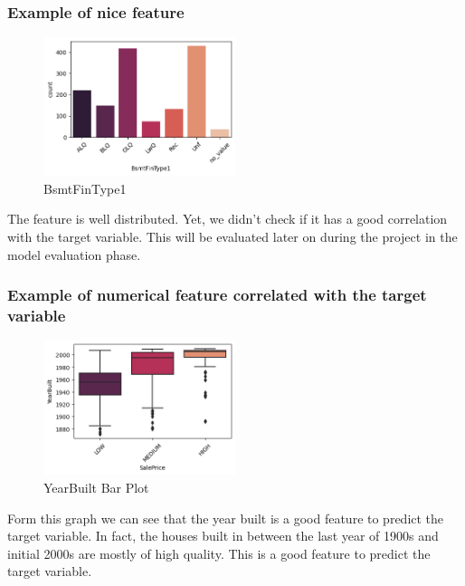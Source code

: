 \subsubsection*{Example of nice feature}
\begin{figure}[h!]
    \centering
    \includegraphics[width=0.5\textwidth]{imgs/BsmtFinType1.png}
    \caption{BsmtFinType1}
    \label{fig:bsmtfintype1}
\end{figure}

The feature is well distributed. Yet, we didn't check if it has a good correlation with the target variable. This will be evaluated later on during the project in the model evaluation phase.
\newpage
\subsubsection*{Example of numerical feature correlated with the target variable}
\begin{figure}[h!]
    \centering
    \includegraphics[width=0.5\textwidth]{imgs/BarPlotYearBuilt.png}
    \caption{YearBuilt Bar Plot}
    \label{fig:yearbuilt}
\end{figure}

Form this graph we can see that the year built is a good feature to predict the target variable. In fact, the houses built in between the last year of 1900s and initial 2000s are mostly of high quality. This is a good feature to predict the target variable.
% 
\newpage

